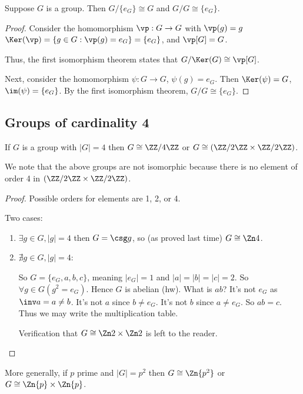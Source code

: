 \documentclass[notes.tex]{subfiles}
\begin{document}

\begin{proposition}
	Suppose $G$ is a group. Then $G/\{e_G\}\cong G$ and $G/G \cong \{e_G\}$.
\end{proposition}

\begin{proof}
	Consider the homomorphism $\vp:G\to G$ with $\vp(g) = g$ 
	$\Ker(\vp) = \{g\in G : \vp(g) = e_G\} = \{e_G\}$, and $\vp[G] = G$.

	Thus, the first isomorphism theorem states that $G/\Ker(G)\cong \vp[G]$.

	Next, consider the homomorphism $\psi:G\to G$, $\psi(g) = e_G$.
	Then $\Ker(\psi) = G$, $\im(\psi) = \{e_G\}$. By the first isomorphism theorem, $G/G \cong \{e_G\}$.
\end{proof}

\subsection*{Groups of cardinality 4}

\begin{proposition}
	If $G$ is a group with $|G| = 4$ then $G \cong \ZZ/4\ZZ$ or $G\cong (\ZZ/2\ZZ \times \ZZ/2\ZZ)$.
\end{proposition}
We note that the above groups are not isomorphic because there is no element of order 4 in $(\ZZ/2\ZZ \times \ZZ/2\ZZ)$.

\begin{proof}
	Possible orders for elements are 1, 2, or 4.

	Two cases:
	\begin{enumerate}
		\item
		$\exists g \in G, |g| = 4$
		then $G = \csg g$, so (as proved last time) $G\cong\Zn4$.
		\item
		$\nexists g\in G, |g| = 4$: 

		So $G = \{e_G, a, b,c \}$, meaning
		$|e_G| = 1$ and $|a| = |b| = |c| = 2$.
		So $\forall g\in G(g^2 = e_G)$. Hence $G$ is abelian (hw).
		What is $ab$? It's not $e_G$ as $\inv a = a \ne b$.
		It's not $a$ since $b \ne e_G$. It's not $b$ since $a \ne e_G$.
		So $ab = c$.
		Thus we may write the multiplication table. 

		Verification that $G\cong \Zn2\times\Zn2$ is left to the reader.
	\end{enumerate}
\end{proof}

\begin{remark}
	More generally, if $p$ prime and $|G| = p^2$ then $G\cong \Zn{p^2}$ or $G\cong \Zn{p}\times\Zn{p}$.
\end{remark}
\end{document}

